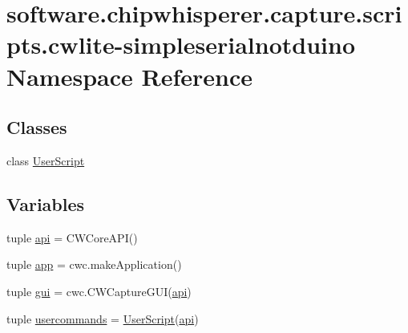 \hypertarget{namespacesoftware_1_1chipwhisperer_1_1capture_1_1scripts_1_1cwlite-simpleserialnotduino}{}\section{software.\+chipwhisperer.\+capture.\+scripts.\+cwlite-\/simpleserialnotduino Namespace Reference}
\label{namespacesoftware_1_1chipwhisperer_1_1capture_1_1scripts_1_1cwlite-simpleserialnotduino}
\subsection*{Classes}
\begin{DoxyCompactItemize}
\item 
class \hyperlink{classsoftware_1_1chipwhisperer_1_1capture_1_1scripts_1_1cwlite-simpleserialnotduino_1_1UserScript}{User\+Script}
\end{DoxyCompactItemize}
\subsection*{Variables}
\begin{DoxyCompactItemize}
\item 
tuple \hyperlink{namespacesoftware_1_1chipwhisperer_1_1capture_1_1scripts_1_1cwlite-simpleserialnotduino_a0c9ed2654c291d4613bdc37fc846be35}{api} = C\+W\+Core\+A\+P\+I()
\item 
tuple \hyperlink{namespacesoftware_1_1chipwhisperer_1_1capture_1_1scripts_1_1cwlite-simpleserialnotduino_aad456a539011c4f030350840006d71ba}{app} = cwc.\+make\+Application()
\item 
tuple \hyperlink{namespacesoftware_1_1chipwhisperer_1_1capture_1_1scripts_1_1cwlite-simpleserialnotduino_a44764f6dc1cf953e93456f4075da5ee2}{gui} = cwc.\+C\+W\+Capture\+G\+U\+I(\hyperlink{namespacesoftware_1_1chipwhisperer_1_1capture_1_1scripts_1_1cwlite-simpleserialnotduino_a0c9ed2654c291d4613bdc37fc846be35}{api})
\item 
tuple \hyperlink{namespacesoftware_1_1chipwhisperer_1_1capture_1_1scripts_1_1cwlite-simpleserialnotduino_a97e6b9bfaa7a9bbe9d14dd2f28d218b0}{usercommands} = \hyperlink{classsoftware_1_1chipwhisperer_1_1capture_1_1scripts_1_1cwlite-simpleserialnotduino_1_1UserScript}{User\+Script}(\hyperlink{namespacesoftware_1_1chipwhisperer_1_1capture_1_1scripts_1_1cwlite-simpleserialnotduino_a0c9ed2654c291d4613bdc37fc846be35}{api})
\end{DoxyCompactItemize}



